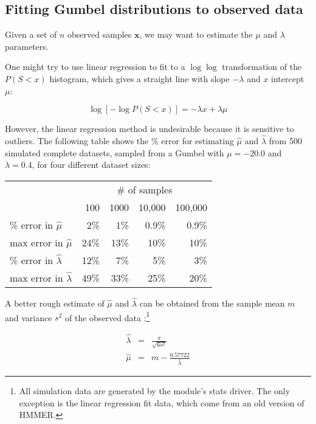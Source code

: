 \subsection{Fitting Gumbel distributions to observed data}

Given a set of $n$ observed samples $\mathbf{x}$, we may want to
estimate the $\mu$ and $\lambda$ parameters.

One might try to use linear regression to fit to a $\log \log$
transformation of the $P(S < x)$ histogram, which gives a straight
line with slope $-\lambda$ and $x$ intercept $\mu$:

\begin{equation}
\log \left[ -\log P(S<x) \right] = -\lambda x + \lambda \mu
\end{equation}

However, the linear regression method is undesirable because it is
sensitive to outliers. The following table shows the \% error for
estimating $\hat{\mu}$ and $\hat{\lambda}$ from 500 simulated complete
datasets, sampled from a Gumbel with $\mu = -20.0$ and $\lambda =
0.4$, for four different dataset sizes:

\begin{center}
\begin{tabular}{lrrrr} \hline
                              & \multicolumn{4}{c}{\# of samples}\\
                              & 100 & 1000  & 10,000 & 100,000 \\
\% error in $\hat{\mu}$       &  2\%&   1\% & 0.9\%  &  0.9\%  \\
max error in $\hat{\mu}$      & 24\%&  13\% &  10\%  &   10\%  \\
\% error in $\hat{\lambda}$   & 12\%&   7\% &   5\%  &    3\%  \\
max error in $\hat{\lambda}$  & 49\%&  33\% &  25\%  &   20\%  \\ \hline
\end{tabular}
\end{center}


A better rough estimate of $\hat{\mu}$ and $\hat{\lambda}$ can be
obtained from the sample mean $m$ and variance $s^2$ of the observed
data \citep{Evans00}:\footnote{All simulation data are generated by
the  module's stats driver. The only exception is the
linear regression fit data, which come from an old version of HMMER.}

\begin{eqnarray*}
  \hat{\lambda} & = & \frac{\pi}{\sqrt{6s^2}}\\
  \hat{\mu}     & = & m - \frac{0.57722}{\hat{\lambda}}
\end{eqnarray*}

